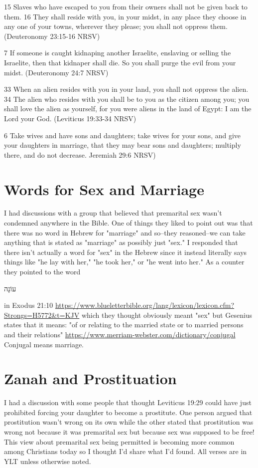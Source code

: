 \documentclass[11pt]{article}
\begin{document}
15 Slaves who have escaped to you from their owners shall not be given back to them. 16 They shall reside with you, in your midst, in any place they choose in any one of your towns, wherever they please; you shall not oppress them. (Deuteronomy 23:15-16 NRSV)


7 If someone is caught kidnaping another Israelite, enslaving or selling the Israelite, then that kidnaper shall die. So you shall purge the evil from your midst. (Deuteronomy 24:7 NRSV)


33 When an alien resides with you in your land, you shall not oppress the alien. 34 The alien who resides with you shall be to you as the citizen among you; you shall love the alien as yourself, for you were aliens in the land of Egypt: I am the Lord your God. (Leviticus 19:33-34 NRSV)


6 Take wives and have sons and daughters; take wives for your sons, and give your daughters in marriage, that they may bear sons and daughters; multiply there, and do not decrease. Jeremiah 29:6 NRSV)


\section{Words for Sex and Marriage}
I had discussions with a group that believed that premarital sex wasn't condemned anywhere in the Bible. One of things they liked to point out was that there was no word in Hebrew for "marriage" and so--they reasoned--we can take anything that is stated as "marriage" as possibly just "sex." I responded that there isn't actually a word for "sex" in the Hebrew since it instead literally says things like "he lay with her," "he took her," or "he went into her." As a counter they pointed to the word \begin{hebrew}  עוֹנָה  \end{hebrew} in Exodus 21:10 \url{https://www.blueletterbible.org/lang/lexicon/lexicon.cfm?Strongs=H5772&t=KJV} which they thought obviously meant "sex" but Gesenius states that it means:  "of or relating to the married state or to married persons and their relations" \url{https://www.merriam-webster.com/dictionary/conjugal} Conjugal means marriage.

\section{Zanah and Prostituation}
I had a discussion with some people that thought Leviticus 19:29 could have just prohibited forcing your daughter to become a prostitute. One person argued that prostitution wasn’t wrong on its own while the other stated that prostitution was wrong not because it was premarital sex but because sex was supposed to be free! This view about premarital sex being permitted is becoming more common among Christians today so I thought I’d share what I’d found. All verses are in YLT unless otherwise noted.
\end{document}
